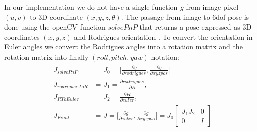 In our implementation we do not have a single function $g$ from image pixel $(u,v)$ to 3D coordinate $(x,y,z,\theta)$. The passage from image to 6dof pose is done using the openCV function $solvePnP$ \cite{opencv_library} that returns a pose expressed as 3D coordinates $(x,y,z)$ and Rodrigues orientation  \cite{belongie1999rodrigues}. To convert the orientation in Euler angles we convert the Rodrigues angles into a rotation matrix and the rotation matrix into finally $(roll,pitch,yaw)$ notation:
\begin{align}
\begin{split}
J_{solvePnP} &= J_0 = \Big[ \frac  {\partial g}{\partial rodrigues},  \frac {\partial g}{\partial xyzpos} \Big] \\[10pt]
J_{rodriguesToR} &= J_1 =  \frac  {\partial rodrigues}{\partial R}, \\[10pt]
J_{RToEuler} &= J_2 =  \frac  {\partial R}{\partial euler}, \\[10pt]
J_{Final} &= J = \Big[ \frac  {\partial g}{\partial euler},  \frac {\partial g}{\partial xyzpos} \Big]  = J_{0}{\begin{bmatrix}
J_{1}J_{2} & 0 \\[10pt]
0 & I 
\end{bmatrix}}
\end{split}
\end{align}


